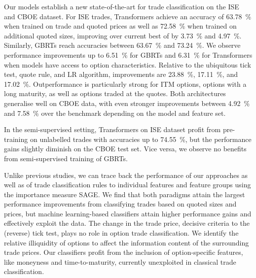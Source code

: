 Our models establish a new state-of-the-art for trade classification on the \gls{ISE} and \gls{CBOE} dataset. For \gls{ISE} trades, Transformers achieve an accuracy of \SI{63.78}{\percent} when trained on trade and quoted prices as well as \SI{72.58}{\percent} when trained on additional quoted sizes, improving over current best of \textcite[][27]{grauerOptionTradeClassification2022} by \SI{3.73}{\percent} and \SI{4.97}{\percent}. Similarly, \glspl{GBRT} reach accuracies between \SI{63.67}{\percent} and \SI{73.24}{\percent}. We observe performance improvements up to \SI{6.51}{\percent} for \glspl{GBRT} and \SI{6.31}{\percent} for Transformers when models have access to option characteristics. Relative to the ubiquitous tick test, quote rule, and LR algorithm, improvements are \SI{23.88}{\percent}, \SI{17.11}{\percent}, and \SI{17.02}{\percent}. Outperformance is particularly strong for \gls{ITM} options, options with a long maturity, as well as options traded at the quotes. Both architectures generalise well on \gls{CBOE} data, with even stronger improvements between \SI{4.92}{\percent} and \SI{7.58}{\percent} over the benchmark depending on the model and feature set. 

In the semi-supervised setting, Transformers on \gls{ISE} dataset profit from pre-training on unlabelled trades with accuracies up to \SI{74.55}{\percent}, but the performance gains slightly diminish on the \gls{CBOE} test set. Vice versa, we observe no benefits from semi-supervised training of \glspl{GBRT}.

Unlike previous studies, we can trace back the performance of our approaches as well as of trade classification rules to individual features and feature groups using the importance measure \gls{SAGE}. We find that both paradigms attain the largest performance improvements from classifying trades based on quoted sizes and prices, but machine learning-based classifiers attain higher performance gains and effectively exploit the data. The change in the trade price, decisive criteria to the (reverse) tick test, plays no role in option trade classification. We identify the relative illiquidity of options to affect the information content of the surrounding trade prices. Our classifiers profit from the inclusion of option-specific features, like moneyness and time-to-maturity, currently unexploited in classical trade classification.

